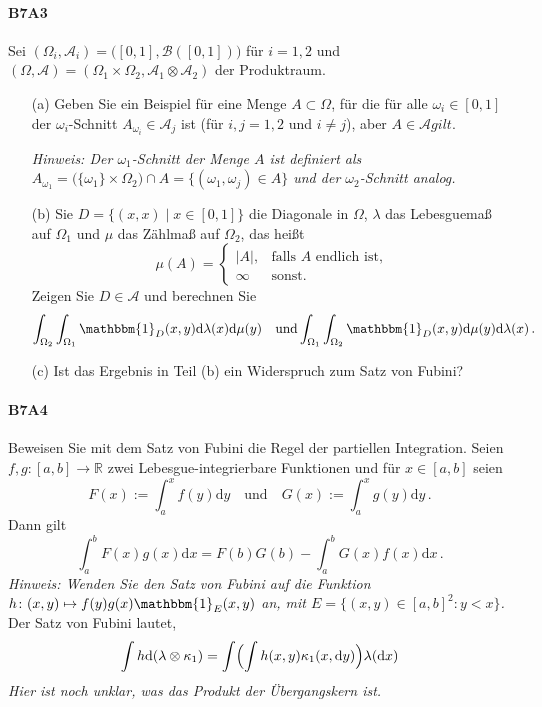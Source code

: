 \documentclass{article}
\begin{document}
\paragraph{B7A3}
Sei $(\Omega_i,\mathcal{A}_i)=\bigl([0,1],\mathcal{B}([0,1])\bigr)$ für $i=1,2$ und $(\Omega,\mathcal{A})=(\Omega_1\times\Omega_2,\mathcal{A}_1\otimes\mathcal{A}_2)$ der Produktraum.
\begin{enumerate}
\item[(a)] Geben Sie ein Beispiel für eine Menge
  $A\subset\Omega$, für die für alle $\omega_i\in[0,1]$ der
  $\omega_i$-Schnitt $A_{\omega_i}\in\mathcal{A}_j$ ist (für
  $i,j=1,2$ und $i\neq j$), aber $A\in\mathcal{A} gilt$.

  \emph{Hinweis: Der $\omega_1$-Schnitt der Menge $A$ ist definiert als $A_{\omega_1}=\bigl(\{\omega_1\}\times\Omega_2\bigr)\cap A=\{(\omega_1,\omega_j)\in A\}$ und der $\omega_2$-Schnitt analog.}
  
\item[(b)] Sie $D=\{(x,x)\mid x\in[0,1]\}$ die Diagonale in $\Omega$, $\lambda$ das Lebesguemaß auf $\Omega_1$ und $\mu$ das Zählmaß auf $\Omega_2$, das heißt
  \[
    \mu(A)=
    \begin{cases}
      |A|,&\text{falls $A$ endlich ist,}\\
      \infty&\text{sonst.}
    \end{cases}
  \]
  Zeigen Sie $D\in\mathcal{A}$ und berechnen Sie
  \[
    \int_{\Omega_2}\int_{\Omega_1}\mathbbm{1}_{D}(x,y)\mathrm{d}\lambda(x)\mathrm{d}\mu(y)\quad\text{und}\int_{\Omega_1}\int_{\Omega_2}\mathbbm{1}_{D}(x,y)\mathrm{d}\mu(y)\mathrm{d}\lambda(x)\,.
  \]
\item[(c)] Ist das Ergebnis in Teil (b) ein Widerspruch zum Satz von Fubini?
\end{enumerate}
\newpage

\paragraph{B7A4}
Beweisen Sie mit dem Satz von Fubini die Regel der partiellen Integration.
Seien $f,g\colon [a,b]\to\mathbb{R}$ zwei Lebesgue-integrierbare Funktionen und für $x\in[a,b]$ seien
\[
  F(x):=\int_a^xf(y)\mathrm{d}y\quad\text{und}\quad G(x):=\int_a^xg(y)\mathrm{d}y\,.
\]
Dann gilt
\[
  \int_a^bF(x)g(x)\mathrm{d}x=F(b)G(b)-\int_a^bG(x)f(x)\mathrm{d}x\,.
\]
\emph{Hinweis: Wenden Sie den Satz von Fubini auf die Funktion $h\colon (x,y)\mapsto f(y)g(x)\mathbbm{1}_E(x,y)$ an, mit $E=\{(x,y)\in[a,b]^2:y<x\}$.}
Der Satz von Fubini lautet, 
\[
  \int h\mathrm{d}(\lambda\otimes\kappa_1)=\int\Bigl(\int h(x,y)\kappa_1(x,\mathrm{d}y)\Bigr)\lambda(\mathrm{d}x)
\]
\emph{Hier ist noch unklar, was das Produkt der Übergangskern ist.}
\newpage



\end{document}
